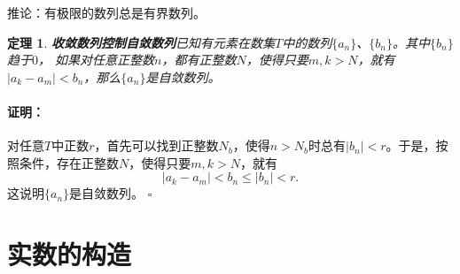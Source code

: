 \documentclass[12pt,UTF8]{ctexbook}
\newtheorem{tm}{定理}[section]
\renewenvironment{proof}{\paragraph{\textbf{证明：}}}{\hfill$\square$}
\begin{document}
\begin{appendix}
推论：有极限的数列总是有界数列。

\begin{tm}{\textbf{收敛数列控制自敛数列}}\label{tm:a-0-80}
    已知有元素在数集$T$中的数列$\{a_n\}$、$\{b_n\}$。其中$\{b_n\}$趋于$0$，
    如果对任意正整数$n$，都有正整数$N$，使得只要$m,k>N$，就有$|a_k - a_m| < b_n$，那么$\{a_n\}$是自敛数列。
\end{tm}
\begin{proof}
    对任意$T$中正数$r$，首先可以找到正整数$N_b$，使得$n>N_b$时总有$|b_n| < r$。于是，按照条件，存在正整数$N$，使得只要$m,k>N$，就有
    $$|a_k - a_m| < b_n \leqslant |b_n| < r.$$
    这说明$\{a_n\}$是自敛数列。
\end{proof}

\section{实数的构造}


\end{appendix}
\end{document}
